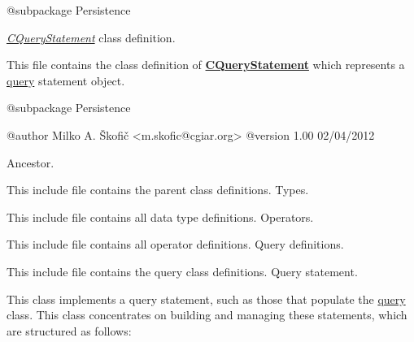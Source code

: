 \begin{DoxyVerb}    @subpackage     Persistence\end{DoxyVerb}


{\itshape \hyperlink{class_c_query_statement}{C\-Query\-Statement}} class definition.

This file contains the class definition of {\bfseries \hyperlink{class_c_query_statement}{C\-Query\-Statement}} which represents a \hyperlink{class_c_query}{query} statement object.

\begin{DoxyVerb}    @subpackage     Persistence

    @author         Milko A. Škofič <m.skofic@cgiar.org>
    @version        1.00 02/04/2012\end{DoxyVerb}


Ancestor.

This include file contains the parent class definitions. Types.

This include file contains all data type definitions. Operators.

This include file contains all operator definitions. Query definitions.

This include file contains the query class definitions. Query statement.

This class implements a query statement, such as those that populate the \hyperlink{class_c_query}{query} class. This class concentrates on building and managing these statements, which are structured as follows\-:



